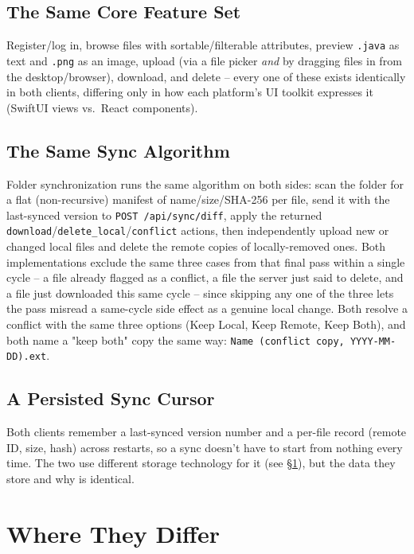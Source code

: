\documentclass[12pt,a4paper]{article}
\begin{document}
\subsection{The Same Core Feature Set}

Register/log in, browse files with sortable/filterable attributes, preview \texttt{.java} as text and \texttt{.png} as an image, upload (via a file picker \emph{and} by dragging files in from the desktop/browser), download, and delete -- every one of these exists identically in both clients, differing only in how each platform's UI toolkit expresses it (SwiftUI views vs.\ React components).

\subsection{The Same Sync Algorithm}

Folder synchronization runs the same algorithm on both sides: scan the folder for a flat (non-recursive) manifest of name/size/SHA-256 per file, send it with the last-synced version to \texttt{POST /api/sync/diff}, apply the returned \texttt{download}/\texttt{delete\_local}/\texttt{conflict} actions, then independently upload new or changed local files and delete the remote copies of locally-removed ones. Both implementations exclude the same three cases from that final pass within a single cycle -- a file already flagged as a conflict, a file the server just said to delete, and a file just downloaded this same cycle -- since skipping any one of the three lets the pass misread a same-cycle side effect as a genuine local change. Both resolve a conflict with the same three options (Keep Local, Keep Remote, Keep Both), and both name a "keep both" copy the same way: \texttt{Name (conflict copy, YYYY-MM-DD).ext}.

\subsection{A Persisted Sync Cursor}

Both clients remember a last-synced version number and a per-file record (remote ID, size, hash) across restarts, so a sync doesn't have to start from nothing every time. The two use different storage technology for it (see \S\ref{sec:differences}), but the data they store and why is identical.

\section{Where They Differ}
\label{sec:differences}
\end{document}
